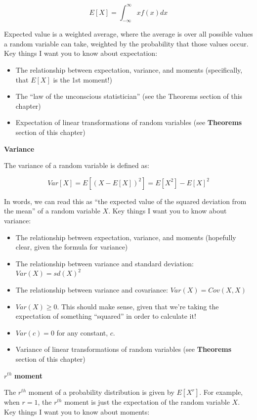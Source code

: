 \documentclass[
  letterpaper,
  DIV=11,
  numbers=noendperiod]{scrreprt}
\begin{document}
\[
E[X] = \int_{-\infty}^\infty x f(x) dx
\]

Expected value is a weighted average, where the average is over all
possible values a random variable can take, weighted by the probability
that those values occur. Key things I want you to know about
expectation:

\begin{itemize}
\item
  The relationship between expectation, variance, and moments
  (specifically, that \(E[X]\) is the 1st moment!)
\item
  The ``law of the unconscious statistician'' (see the Theorems section
  of this chapter)
\item
  Expectation of linear transformations of random variables (see
  \textbf{Theorems} section of this chapter)
\end{itemize}

\textbf{Variance}

The variance of a random variable is defined as:

\[
Var[X] = E[(X - E[X])^2] = E[X^2] - E[X]^2
\]

In words, we can read this as ``the expected value of the squared
deviation from the mean'' of a random variable \(X\). Key things I want
you to know about variance:

\begin{itemize}
\item
  The relationship between expectation, variance, and moments (hopefully
  clear, given the formula for variance)
\item
  The relationship between variance and standard deviation:
  \(Var(X) = sd(X)^2\)
\item
  The relationship between variance and covariance:
  \(Var(X) = Cov(X, X)\)
\item
  \(Var(X) \geq 0\). This should make sense, given that we're taking the
  expectation of something ``squared'' in order to calculate it!
\item
  \(Var(c) = 0\) for any constant, \(c\).
\item
  Variance of linear transformations of random variables (see
  \textbf{Theorems} section of this chapter)
\end{itemize}

\(r^{th}\) \textbf{moment}

The \(r^{th}\) moment of a probability distribution is given by
\(E[X^r]\). For example, when \(r = 1\), the \(r^{th}\) moment is just
the expectation of the random variable \(X\). Key things I want you to
know about moments:
\end{document}

